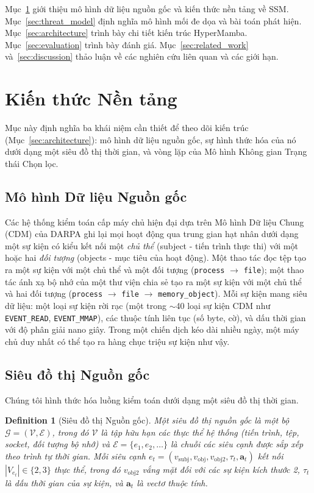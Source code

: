 \documentclass[letterpaper,twocolumn,10pt]{article}
\newtheorem{definition}{Definition}
\begin{document}
Mục~\ref{sec:background} giới thiệu mô hình dữ liệu nguồn gốc và kiến thức nền tảng về SSM. Mục~\ref{sec:threat_model} định nghĩa mô hình mối đe dọa và bài toán phát hiện. Mục~\ref{sec:architecture} trình bày chi tiết kiến trúc HyperMamba. Mục~\ref{sec:evaluation} trình bày đánh giá. Mục~\ref{sec:related_work} và~\ref{sec:discussion} thảo luận về các nghiên cứu liên quan và các giới hạn.

\section{Kiến thức Nền tảng}
\label{sec:background}

Mục này định nghĩa ba khái niệm cần thiết để theo dõi kiến trúc (Mục~\ref{sec:architecture}): mô hình dữ liệu nguồn gốc, sự hình thức hóa của nó dưới dạng một siêu đồ thị thời gian, và vòng lặp của Mô hình Không gian Trạng thái Chọn lọc.

\subsection{Mô hình Dữ liệu Nguồn gốc}
\label{sec:provenance}

Các hệ thống kiểm toán cấp máy chủ hiện đại dựa trên Mô hình Dữ liệu Chung (CDM) của DARPA ghi lại mọi hoạt động qua trung gian hạt nhân dưới dạng một sự kiện có kiểu kết nối một \emph{chủ thể} (subject - tiến trình thực thi) với một hoặc hai \emph{đối tượng} (objects - mục tiêu của hoạt động). Một thao tác đọc tệp tạo ra một sự kiện với một chủ thể và một đối tượng (\texttt{process} $\to$ \texttt{file}); một thao tác ánh xạ bộ nhớ của một thư viện chia sẻ tạo ra một sự kiện với một chủ thể và hai đối tượng (\texttt{process} $\to$ \texttt{file} $\to$ \texttt{memory\_object}). Mỗi sự kiện mang siêu dữ liệu: một loại sự kiện rời rạc (một trong $\sim$40 loại sự kiện CDM như \texttt{EVENT\_READ}, \texttt{EVENT\_MMAP}), các thuộc tính liên tục (số byte, cờ), và dấu thời gian với độ phân giải nano giây. Trong một chiến dịch kéo dài nhiều ngày, một máy chủ duy nhất có thể tạo ra hàng chục triệu sự kiện như vậy.

\subsection{Siêu đồ thị Nguồn gốc}
\label{sec:hypergraph}

Chúng tôi hình thức hóa luồng kiểm toán dưới dạng một siêu đồ thị thời gian.

\begin{definition}[Siêu đồ thị Nguồn gốc]
\label{def:hypergraph}
Một \emph{siêu đồ thị nguồn gốc} là một bộ $\mathcal{G} = (\mathcal{V}, \mathcal{E})$, trong đó $\mathcal{V}$ là tập hữu hạn các thực thể hệ thống (tiến trình, tệp, socket, đối tượng bộ nhớ) và $\mathcal{E} = \{e_1, e_2, \dots\}$ là chuỗi các siêu cạnh được sắp xếp theo trình tự thời gian. Mỗi siêu cạnh $e_t = (v_{\text{subj}}, v_{\text{obj}}, v_{\text{obj2}}, \tau_t, \mathbf{a}_t)$ kết nối $|V_{e_t}| \in \{2, 3\}$ thực thể, trong đó $v_{\text{obj2}}$ vắng mặt đối với các sự kiện kích thước 2, $\tau_t$ là dấu thời gian của sự kiện, và $\mathbf{a}_t$ là vectơ thuộc tính.
\end{definition}
\end{document}
